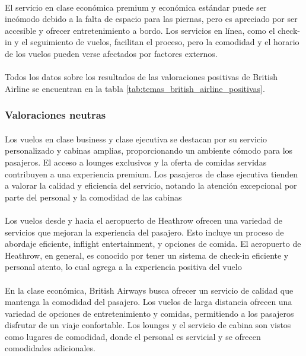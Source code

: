 \documentclass{report}
\begin{document}
{                    \paragraph*{}{
                        El servicio en clase económica premium y económica estándar puede ser incómodo debido a la falta de espacio para las piernas, pero es apreciado por ser accesible y ofrecer entretenimiento a bordo. Los servicios en línea, como el check-in y el seguimiento de vuelos, facilitan el proceso, pero la comodidad y el horario de los vuelos pueden verse afectados por factores externos.
                    }
                    \paragraph*{}{
                        Todos los datos sobre los resultados de las valoraciones positivas de British Airline se encuentran en la tabla \ref{tab:temas_british_airline_positivas}.
                    }
                \subsubsection*{Valoraciones neutras}
                    \paragraph*{}{
                        Los vuelos en clase business y clase ejecutiva se destacan por su servicio personalizado y cabinas amplias, proporcionando un ambiente cómodo para los pasajeros. El acceso a lounges exclusivos y la oferta de comidas servidas contribuyen a una experiencia premium. Los pasajeros de clase ejecutiva tienden a valorar la calidad y eficiencia del servicio, notando la atención excepcional por parte del personal y la comodidad de las cabinas
                    }
                    \paragraph*{}{
                        Los vuelos desde y hacia el aeropuerto de Heathrow ofrecen una variedad de servicios que mejoran la experiencia del pasajero. Esto incluye un proceso de abordaje eficiente, inflight entertainment, y opciones de comida. El aeropuerto de Heathrow, en general, es conocido por tener un sistema de check-in eficiente y personal atento, lo cual agrega a la experiencia positiva del vuelo
                    }
                    \paragraph*{}{
                        En la clase económica, British Airways busca ofrecer un servicio de calidad que mantenga la comodidad del pasajero. Los vuelos de larga distancia ofrecen una variedad de opciones de entretenimiento y comidas, permitiendo a los pasajeros disfrutar de un viaje confortable. Los lounges y el servicio de cabina son vistos como lugares de comodidad, donde el personal es servicial y se ofrecen comodidades adicionales.
                    }
}
\end{document}
